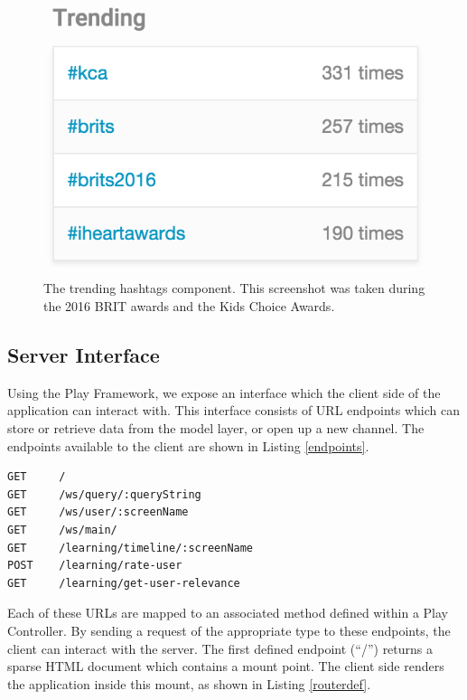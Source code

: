 \documentclass{l4proj}
\begin{document}
\begin{figure}
\centering
\includegraphics[scale=0.75]{trending.png}
\caption{The trending hashtags component. This screenshot was taken during the 2016 BRIT awards and the Kids Choice Awards.}
\label{trending}
\end{figure}
                       
    \subsection{Server Interface}
    Using the Play Framework, we expose an interface which the client side of the application can interact with. This interface consists of URL endpoints which can store or retrieve data from the model layer, or open up a new channel. The endpoints available to the client are shown in Listing \ref{endpoints}.
    
\begin{lstlisting}[label=endpoints,caption=The exposed interface of the server.]
GET     /
GET     /ws/query/:queryString                      
GET     /ws/user/:screenName                        
GET     /ws/main/                      
GET     /learning/timeline/:screenName              
POST    /learning/rate-user                         
GET     /learning/get-user-relevance                
\end{lstlisting}

Each of these URLs are mapped to an associated method defined within a Play Controller. By sending a request of the appropriate type to these endpoints, the client can interact with the server. The first defined endpoint (``/'') returns a sparse HTML document which contains a mount point. The client side renders the application inside this mount, as shown in Listing \ref{routerdef}.
\end{document}
